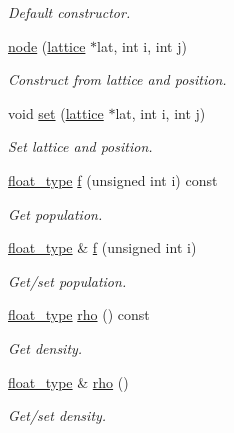 \begin{DoxyCompactItemize}
\begin{DoxyCompactList}\small\item\em \-Default constructor. \end{DoxyCompactList}\item 
\hyperlink{structlb_1_1node_ad0a28414f7071eaeec65ed336c2c3954}{node} (\hyperlink{classlb_1_1lattice}{lattice} $\ast$lat, int i, int j)
\begin{DoxyCompactList}\small\item\em \-Construct from lattice and position. \end{DoxyCompactList}\item 
void \hyperlink{structlb_1_1node_a4076d4eccd4b9a71d96368f9a3097d04}{set} (\hyperlink{classlb_1_1lattice}{lattice} $\ast$lat, int i, int j)
\begin{DoxyCompactList}\small\item\em \-Set lattice and position. \end{DoxyCompactList}\item 
\hyperlink{namespacelb_a2b37d1585aef2d3da421ad0aedc6b11b}{float\-\_\-type} \hyperlink{structlb_1_1node_abb4c3fa64735598f6a1534cc75b6bfe7}{f} (unsigned int i) const 
\begin{DoxyCompactList}\small\item\em \-Get population. \end{DoxyCompactList}\item 
\hyperlink{namespacelb_a2b37d1585aef2d3da421ad0aedc6b11b}{float\-\_\-type} \& \hyperlink{structlb_1_1node_a0f7a235525b0b200e1ab8a31d27d8c25}{f} (unsigned int i)
\begin{DoxyCompactList}\small\item\em \-Get/set population. \end{DoxyCompactList}\item 
\hyperlink{namespacelb_a2b37d1585aef2d3da421ad0aedc6b11b}{float\-\_\-type} \hyperlink{structlb_1_1node_ad71907419dde436ab210283460332edf}{rho} () const 
\begin{DoxyCompactList}\small\item\em \-Get density. \end{DoxyCompactList}\item 
\hyperlink{namespacelb_a2b37d1585aef2d3da421ad0aedc6b11b}{float\-\_\-type} \& \hyperlink{structlb_1_1node_af0b982ae810b56c36b2ff91ba8e0c9c3}{rho} ()
\begin{DoxyCompactList}\small\item\em \-Get/set density. \end{DoxyCompactList}\item 

\end{DoxyCompactItemize}
